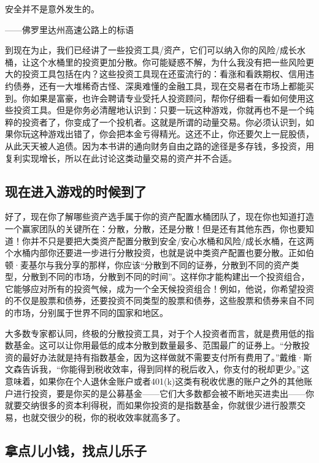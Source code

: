 \begin{BookQuote}
安全并不是意外发生的。

\hfill ——佛罗里达州高速公路上的标语
\end{BookQuote}

到现在为止，我们已经讲了一些投资工具/资产，它们可以纳入你的风险/成长水桶，让这个水桶里的投资更加分散。你可能疑惑不解，为什么我没有把一些风险更大的投资工具包括在内？这些投资工具现在还蛮流行的：看涨和看跌期权、信用违约债券，还有一大堆稀奇古怪、深奥难懂的金融工具，现在交易者在市场上都能买到。你如果是富豪，也许会聘请专业受托人投资顾问，帮你仔细看一看如何使用这些投资工具。但是你务必清醒地认识到：只要一玩这种游戏，你就再也不是一个纯粹的投资者了，你变成了一个投机者。这就是所谓的动量交易。你必须认识到，如果你玩这种游戏出错了，你会把本金亏得精光。这还不止，你还要欠上一屁股债，从此天天被人追债。因为本书讲的通向财务自由之路的途径是多存钱，多投资，用复利实现增长，所以在此讨论这类动量交易的资产并不合适。

\subsection{现在进入游戏的时候到了}

好了，现在你了解哪些资产选手属于你的资产配置水桶团队了，现在你也知道打造一个赢家团队的关键所在：分散，分散，还是分散！但是还有其他东西，你也要知道！你并不只是要把大类资产配置分散到安全/安心水桶和风险/成长水桶，在这两个水桶内部你还要进一步进行分散投资，也就是说中类资产配置也要分散。正如伯顿·麦基尔与我分享的那样，你应该“分散到不同的证券，分散到不同的资产类型，分散到不同的市场，分散到不同的时间”。这样你才能构建出一个投资组合，它能够应对所有的投资气候，成为一个全天候投资组合！例如，他说，你希望投资的不仅是股票和债券，还要投资不同类型的股票和债券，这些股票和债券来自不同的市场，分别属于世界不同的国家和地区。

大多数专家都认同，终极的分散投资工具，对于个人投资者而言，就是费用低的指数基金。这可以让你用最低的成本分散到数量最多、范围最广的证券上。“分散投资的最好办法就是持有指数基金，因为这样做就不需要支付所有费用了。”戴维·斯文森告诉我，“你能得到税收效率，得到同样的税后收入，你支付的税却更少。”这意味着，如果你在个人退休金账户或者401(k)这类有税收优惠的账户之外的其他账户进行投资，要是你买的是公募基金——它们大多数都会被不断地买进卖出——你就要交纳很多的资本利得税，而如果你投资的是指数基金，你就很少进行股票交易，也就交很少的税，你的税收效率就高多了。

\subsection{拿点儿小钱，找点儿乐子}

